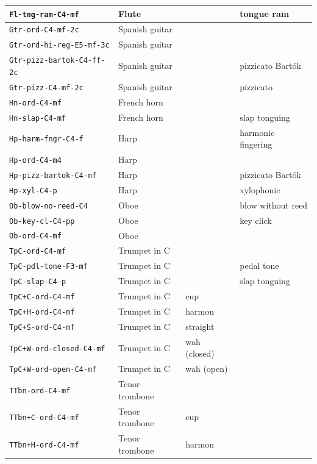 \documentclass{bmcart}
\begin{document}
\begin{backmatter}
\begin{table}
\begin{tabular}{llll}
        \texttt{Fl-tng-ram-C4-mf} & Flute & & tongue ram \\ \hline
        \texttt{Gtr-ord-C4-mf-2c} & Spanish guitar & & \\
        \texttt{Gtr-ord-hi-reg-E5-mf-3c} & Spanish guitar & & \\
        \texttt{Gtr-pizz-bartok-C4-ff-2c} & Spanish guitar & & pizzicato Bart\'ok\\
        \texttt{Gtr-pizz-C4-mf-2c} & Spanish guitar &  & pizzicato \\ \hline
        \texttt{Hn-ord-C4-mf} & French horn & & \\
        \texttt{Hn-slap-C4-mf} & French horn & & slap tonguing \\ \hline
        \texttt{Hp-harm-fngr-C4-f} & Harp & & harmonic fingering \\
        \texttt{Hp-ord-C4-m4} & Harp & & \\
        \texttt{Hp-pizz-bartok-C4-mf} & Harp & & pizzicato Bart\'ok \\
        \texttt{Hp-xyl-C4-p} & Harp & & xylophonic \\ \hline
        \texttt{Ob-blow-no-reed-C4} & Oboe & & blow without reed \\
        \texttt{Ob-key-cl-C4-pp} & Oboe & & key click \\
        \texttt{Ob-ord-C4-mf} & Oboe & & \\ \hline
        \texttt{TpC-ord-C4-mf} & Trumpet in C & & \\
        \texttt{TpC-pdl-tone-F3-mf} & Trumpet in C & & pedal tone \\
        \texttt{TpC-slap-C4-p} & Trumpet in C & & slap tonguing \\
        \texttt{TpC+C-ord-C4-mf} & Trumpet in C & cup & \\
        \texttt{TpC+H-ord-C4-mf} & Trumpet in C & harmon & \\
        \texttt{TpC+S-ord-C4-mf} & Trumpet in C & straight & \\
        \texttt{TpC+W-ord-closed-C4-mf} & Trumpet in C & wah (closed) & \\
        \texttt{TpC+W-ord-open-C4-mf} & Trumpet in C & wah (open) & \\ \hline
        \texttt{TTbn-ord-C4-mf} & Tenor trombone & &  \\
        \texttt{TTbn+C-ord-C4-mf} & Tenor trombone & cup & \\
        \texttt{TTbn+H-ord-C4-mf} & Tenor trombone & harmon & \\

\end{tabular}
\end{table}
\end{backmatter}
\end{document}
